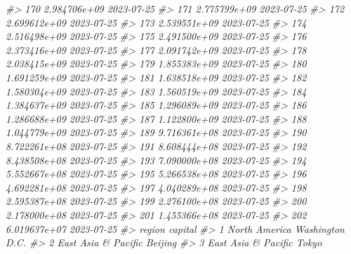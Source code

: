 \documentclass[
  xelatex, ja=standard]{bxjsbook}
\newenvironment{Shaded}{\begin{snugshade}}{\end{snugshade}}
\newcommand{\CommentTok}[1]{\textcolor[rgb]{0.56,0.35,0.01}{\textit{#1}}}
\theoremstyle{definition}
\theoremstyle{definition}
\theoremstyle{definition}
\theoremstyle{definition}
\theoremstyle{remark}
\begin{document}
\begin{Shaded}
\begin{Highlighting}[]
\CommentTok{\#\textgreater{} 170 2.984706e+09         2023{-}07{-}25}
\CommentTok{\#\textgreater{} 171 2.775799e+09         2023{-}07{-}25}
\CommentTok{\#\textgreater{} 172 2.699612e+09         2023{-}07{-}25}
\CommentTok{\#\textgreater{} 173 2.539551e+09         2023{-}07{-}25}
\CommentTok{\#\textgreater{} 174 2.516498e+09         2023{-}07{-}25}
\CommentTok{\#\textgreater{} 175 2.491500e+09         2023{-}07{-}25}
\CommentTok{\#\textgreater{} 176 2.373416e+09         2023{-}07{-}25}
\CommentTok{\#\textgreater{} 177 2.091742e+09         2023{-}07{-}25}
\CommentTok{\#\textgreater{} 178 2.038415e+09         2023{-}07{-}25}
\CommentTok{\#\textgreater{} 179 1.855383e+09         2023{-}07{-}25}
\CommentTok{\#\textgreater{} 180 1.691259e+09         2023{-}07{-}25}
\CommentTok{\#\textgreater{} 181 1.638518e+09         2023{-}07{-}25}
\CommentTok{\#\textgreater{} 182 1.580304e+09         2023{-}07{-}25}
\CommentTok{\#\textgreater{} 183 1.560519e+09         2023{-}07{-}25}
\CommentTok{\#\textgreater{} 184 1.384637e+09         2023{-}07{-}25}
\CommentTok{\#\textgreater{} 185 1.296089e+09         2023{-}07{-}25}
\CommentTok{\#\textgreater{} 186 1.286688e+09         2023{-}07{-}25}
\CommentTok{\#\textgreater{} 187 1.122800e+09         2023{-}07{-}25}
\CommentTok{\#\textgreater{} 188 1.044779e+09         2023{-}07{-}25}
\CommentTok{\#\textgreater{} 189 9.716361e+08         2023{-}07{-}25}
\CommentTok{\#\textgreater{} 190 8.722261e+08         2023{-}07{-}25}
\CommentTok{\#\textgreater{} 191 8.608444e+08         2023{-}07{-}25}
\CommentTok{\#\textgreater{} 192 8.438508e+08         2023{-}07{-}25}
\CommentTok{\#\textgreater{} 193 7.090000e+08         2023{-}07{-}25}
\CommentTok{\#\textgreater{} 194 5.552667e+08         2023{-}07{-}25}
\CommentTok{\#\textgreater{} 195 5.266538e+08         2023{-}07{-}25}
\CommentTok{\#\textgreater{} 196 4.692281e+08         2023{-}07{-}25}
\CommentTok{\#\textgreater{} 197 4.040289e+08         2023{-}07{-}25}
\CommentTok{\#\textgreater{} 198 2.595387e+08         2023{-}07{-}25}
\CommentTok{\#\textgreater{} 199 2.276100e+08         2023{-}07{-}25}
\CommentTok{\#\textgreater{} 200 2.178000e+08         2023{-}07{-}25}
\CommentTok{\#\textgreater{} 201 1.455366e+08         2023{-}07{-}25}
\CommentTok{\#\textgreater{} 202 6.019637e+07         2023{-}07{-}25}
\CommentTok{\#\textgreater{}                         region             capital}
\CommentTok{\#\textgreater{} 1                North America     Washington D.C.}
\CommentTok{\#\textgreater{} 2          East Asia \& Pacific             Beijing}
\CommentTok{\#\textgreater{} 3          East Asia \& Pacific               Tokyo}

\end{Highlighting}
\end{Shaded}
\end{document}
